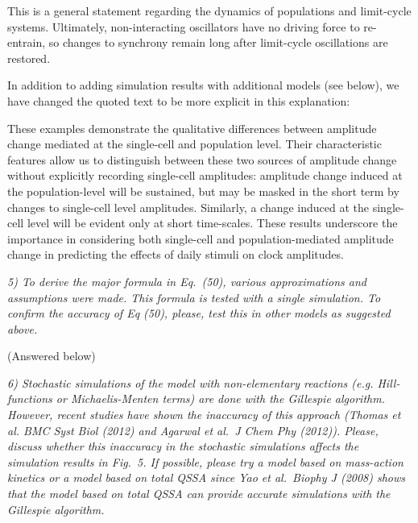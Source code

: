 \documentclass[11pt, letterpaper]{article}
\newenvironment{reviewer}{\itshape\color{gray}}{}
\newenvironment{manuscript}[1]{\begin{center}\begin{tcolorbox}[colback=green!5!white,colframe=green!75!black,width=0.8\textwidth,title={#1},breakable,fonttitle=\bfseries]}{\end{tcolorbox}\end{center}}
\begin{document}
This is a general statement regarding the dynamics of populations and limit-cycle systems. Ultimately, non-interacting oscillators have no driving force to re-entrain, so changes to synchrony remain long after limit-cycle oscillations are restored.

In addition to adding simulation results with additional models (see below), we have changed the quoted text to be more explicit in this explanation:

\begin{manuscript}{Page 14}
These examples demonstrate the qualitative differences between amplitude change mediated at the single-cell and population level.
Their characteristic features allow us to distinguish between these two sources of amplitude change without explicitly recording single-cell amplitudes: amplitude change induced at the population-level will be sustained, but may be masked in the short term by changes to single-cell level amplitudes.
Similarly, a change induced at the single-cell level will be evident only at short time-scales.
These results underscore the importance in considering both single-cell and population-mediated amplitude change in predicting the effects of daily stimuli on clock amplitudes.
\end{manuscript}

\begin{reviewer}
5) To derive the major formula in Eq.~(50), various approximations and assumptions were made.
This formula is tested with a single simulation.
To confirm the accuracy of Eq (50), please, test this in other models as suggested above.
\end{reviewer}

(Answered below)

\begin{reviewer}
6) Stochastic simulations of the model with non-elementary reactions (e.g.
Hill-functions or Michaelis-Menten terms) are done with the Gillespie algorithm.
However, recent studies have shown the inaccuracy of this approach (Thomas et al.
BMC Syst Biol (2012) and Agarwal et al.\ J Chem Phy (2012)).
Please, discuss whether this inaccuracy in the stochastic simulations affects the simulation results in Fig.~5.
If possible, please try a model based on mass-action kinetics or a model based on total QSSA since Yao et al.\ Biophy J (2008) shows that the model based on total QSSA can provide accurate simulations with the Gillespie algorithm.
\end{reviewer}
 
\end{document}
